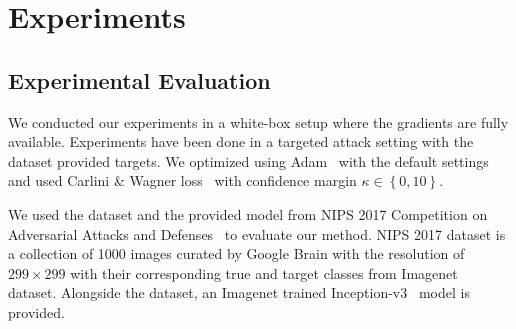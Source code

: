 \chapter{Experiments}
\label{chp:b4}
\section{Experimental Evaluation}
We conducted our experiments in a white-box setup where the gradients are fully available. Experiments have been done in a targeted attack setting with the dataset provided targets. We optimized using Adam~\cite{kingma2015adam} with the default settings and used Carlini \& Wagner loss~\cite{carlini2017towards} with confidence margin \(\kappa \in \left\{ 0, 10 \right\}\).


We used the dataset and the provided model from NIPS 2017 Competition on Adversarial Attacks and Defenses~\cite{kurakin2018adversarial} to evaluate our method. NIPS 2017 dataset is a collection of 1000 images curated by Google Brain with the resolution of \(299 \times 299\) with their corresponding true and target classes from Imagenet~\cite{deng2009imagenet} dataset. Alongside the dataset, an Imagenet trained Inception-v3~\cite{szegedy2016rethinking} model is provided. %

